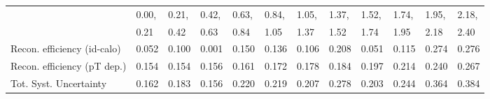 \begin{tabular}{l|p{0.6cm}p{0.6cm}p{0.6cm}p{0.6cm}p{0.6cm}p{0.6cm}p{0.6cm}p{0.6cm}p{0.6cm}p{0.6cm}p{0.6cm}}
\hline
   & 0.00, & 0.21, & 0.42, & 0.63, & 0.84, & 1.05, & 1.37, & 1.52, & 1.74, & 1.95, & 2.18,  \\ 
   & 0.21 & 0.42 & 0.63 & 0.84 & 1.05 & 1.37 & 1.52 & 1.74 & 1.95 & 2.18 & 2.40  \\ 
\hline
Recon. efficiency (id-calo)              & 0.052 & 0.100 & 0.001 & 0.150 & 0.136 & 0.106 & 0.208 & 0.051 & 0.115 & 0.274 & 0.276 \\
\hline
Recon. efficiency (pT dep.)              & 0.154 & 0.154 & 0.156 & 0.161 & 0.172 & 0.178 & 0.184 & 0.197 & 0.214 & 0.240 & 0.267 \\
\hline
Tot. Syst. Uncertainty                   & 0.162 & 0.183 & 0.156 & 0.220 & 0.219 & 0.207 & 0.278 & 0.203 & 0.244 & 0.364 & 0.384 \\
\hline
\end{tabular}
